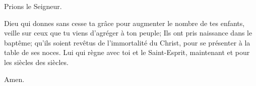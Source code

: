 \pr Prions le Seigneur.

\pr Dieu qui donnes sans cesse ta grâce pour augmenter le nombre de tes enfants, veille sur ceux que tu viens d’agréger à ton peuple; Ils ont pris naissance dans le baptême; qu’ils soient revêtus de l’immortalité du Christ, pour se présenter à la table de ses noces. Lui qui règne avec toi et le Saint-Esprit, maintenant et pour les siècles des siècles.

\be Amen.